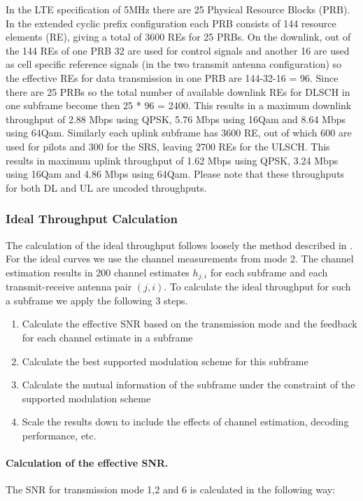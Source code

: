 \documentclass[a4paper,10pt]{article}
\begin{document}
In the LTE specification of 5MHz there are 25 Physical Resource Blocks (PRB). In the extended cyclic prefix configuration each PRB consists of 144 resource elements (RE), giving a total of 3600 REs for 25 PRBs. On the downlink, out of the 144 REs of one PRB 32 are used for control signals and another 16 are used as cell specific reference signals (in the two transmit antenna configuration) so the effective REs for data transmission in one PRB are 144-32-16 = 96. Since there are 25 PRBs so the total number of available downlink REs for DLSCH in one subframe become then 25 * 96 = 2400. This results in a maximum downlink throughput of 2.88 Mbps using QPSK, 5.76 Mbps using 16Qam and 8.64 Mbps using 64Qam. Similarly each uplink subframe has 3600 RE, out of which 600 are used for pilots and 300 for the SRS, leaving 2700 REs for the ULSCH. This results in maximum uplink throughput of 1.62 Mbps using QPSK, 3.24 Mbps using 16Qam and 4.86 Mbps using 64Qam. Please note that these throughputs for both DL and UL are uncoded throughputs. 

\subsubsection{Ideal Throughput Calculation}
The calculation of the ideal throughput follows loosely the method described in \cite{IEEE802.16m_EMD}. For the ideal curves we use the channel measurements from mode 2. The channel estimation results in 200 channel estimates $h_{j,i}$ for each subframe and each transmit-receive antenna pair $(j,i)$. To calculate the ideal throughput for such a subframe we apply the following 3 steps.
\begin{enumerate}
 \item Calculate the effective SNR based on the transmission mode and the feedback for each channel estimate in a subframe
 \item Calculate the best supported modulation scheme for this subframe
 \item Calculate the mutual information of the subframe under the constraint of the supported modulation scheme
 \item Scale the results down to include  the effects of channel estimation, decoding performance, etc. 
\end{enumerate}

\paragraph{Calculation of the effective SNR.}
The SNR for transmission mode 1,2 and 6 is calculated in the following way:
\end{document}
